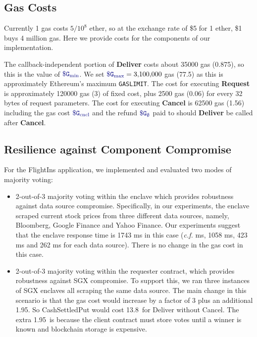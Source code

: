 \subsection{Gas Costs}
Currently 1 gas costs $5 / 10^8$ ether, so at the exchange rate of \$5 for 1 ether, \$1 buys 4 million gas.
Here we provide costs for the components of our implementation.

The callback-independent portion of {\bf Deliver} costs about \num[group-separator={,}]{35000} gas (0.875\textcent), so this is the value of $\constgasmin$.
We set $\constgasmax = \num[group-separator={,}]{3100000}$ gas (77.5\textcent) as this is approximately Ethereum's maximum {\tt GASLIMIT}.
The cost for executing {\bf Request} is approximately \num[group-separator={,}]{120000} gas (3\textcent) of fixed cost, 
plus \num[group-separator={,}]{2500} gas (0.06\textcent) for every 32 bytes of request parameters.
The cost for executing {\bf Cancel} is 62500 gas (1.56\textcent)
including the gas cost $\constgasinvokecancel$ and the refund $\constgascancel$ paid to \tcs should {\bf Deliver} be called after {\bf Cancel}.




\subsection{Resilience against Component Compromise}
\label{subsec:hedging}
For the {\sf FlightIns} application, 
we implemented and evaluated two modes of majority voting:
\begin{itemize}[leftmargin=3mm]
\item
2-out-of-3 majority voting within the enclave which provides robustness
against data source compromise.
Specifically, in our experiments, 
the enclave scraped current stock prices 
from three different data sources, 
namely, Bloomberg, Google Finance and Yahoo Finance.
Our experiments suggest that  
the enclave response time is 
1743 ms in this case ({\it c.f.} ms, 
1058 ms, 423 ms and 262  ms for 
each data source).
There is no change in the gas cost in this case.
\item
2-out-of-3 majority voting within the requester contract,
which provides robustness against 
SGX compromise.
To support this, we ran three instances of SGX enclaves all scraping
the same data source.  
The main change in this scenario is that 
the gas cost would increase by a factor of 3 plus an additional 1.95\textcent.
So {\sf CashSettledPut} would cost 13.8\textcent\ for Deliver without Cancel.
The extra 1.95\textcent\ is because the client contract must store votes
until a winner is known and blockchain storage is expensive.
\end{itemize}


